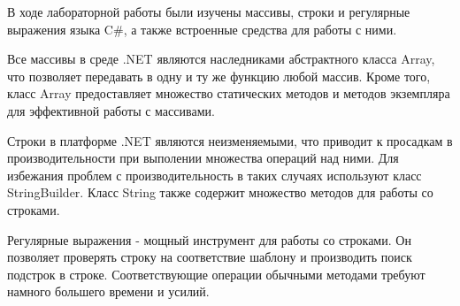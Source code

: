 \documentclass[a4paper,14pt]{extarticle}
\begin{document}
    В ходе лабораторной работы были изучены массивы, строки и регулярные выражения
    языка C\#, а также встроенные средства для работы с ними. 
    
    Все массивы в среде .NET являются наследниками абстрактного класса Array,
    что позволяет передавать в одну и ту же функцию любой массив. Кроме того,
    класс Array предоставляет множество статических методов и методов экземпляра
    для эффективной работы с массивами.

    Строки в платформе .NET являются неизменяемыми, что приводит к просадкам в
    производительности при выполении множества операций над ними. Для избежания
    проблем с производительность в таких случаях используют класс StringBuilder.
    Класс String также содержит множество методов для работы со строками.

    Регулярные выражения - мощный инструмент для работы со строками. Он позволяет
    проверять строку на соответствие шаблону и производить поиск подстрок в строке.
    Соответствующие операции обычными методами требуют намного большего времени и усилий.
\end{document}
